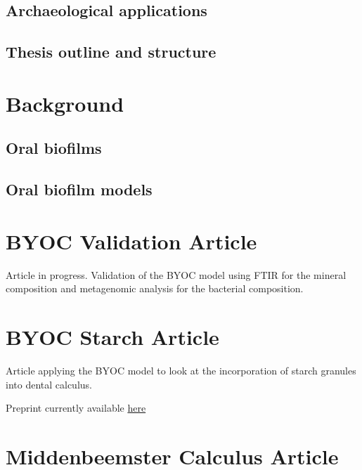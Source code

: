 \documentclass[
]{book}
\begin{document}
\hypertarget{archaeological-applications}{%
\section{Archaeological applications}\label{archaeological-applications}}

\hypertarget{thesis-outline-and-structure}{%
\section{Thesis outline and structure}\label{thesis-outline-and-structure}}

\hypertarget{background}{%
\chapter{Background}\label{background}}

\hypertarget{oral-biofilms}{%
\section{Oral biofilms}\label{oral-biofilms}}

\hypertarget{oral-biofilm-models}{%
\section{Oral biofilm models}\label{oral-biofilm-models}}

\hypertarget{byoc-validation-article}{%
\chapter{BYOC Validation Article}\label{byoc-validation-article}}

Article in progress. Validation of the BYOC model using FTIR for the mineral
composition and metagenomic analysis for the bacterial composition.

\hypertarget{byoc-starch-article}{%
\chapter{BYOC Starch Article}\label{byoc-starch-article}}

Article applying the BYOC model to look at the incorporation of starch granules
into dental calculus.

Preprint currently available \href{https://www.biorxiv.org/content/10.1101/2021.10.27.466104v1}{here}

\hypertarget{middenbeemster-calculus-article}{%
\chapter{Middenbeemster Calculus Article}\label{middenbeemster-calculus-article}}
\end{document}
